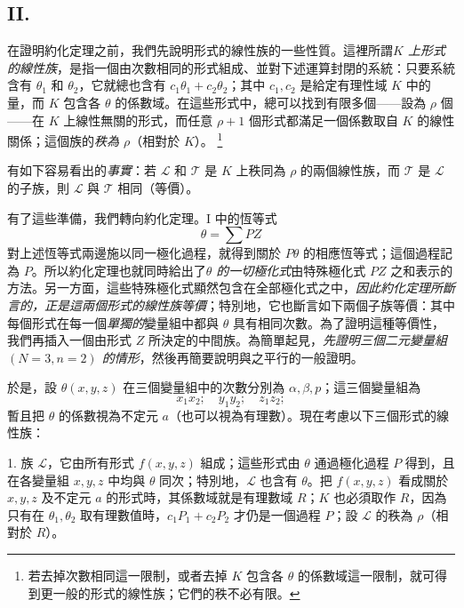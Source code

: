 \documentclass[11pt]{article}
\providecommand{\NoetherSrcNote}[2]{%
  \begingroup\renewcommand{\thefootnote}{#1}\footnote{#2}\addtocounter{footnote}{-1}\endgroup}
\begin{document}
\subsection*{II.}
在證明約化定理之前，我們先說明形式的線性族的一些性質。這裡所謂\emph{$K$ 上形式的線性族}，是指一個由次數相同的形式組成、並對下述運算封閉的系統：只要系統含有 $\theta_1$ 和 $\theta_2$，它就總也含有 $c_1\theta_1+c_2\theta_2$；其中 $c_1,c_2$ 是給定有理性域 $K$ 中的量，而 $K$ 包含各 $\theta$ 的係數域。在這些形式中，總可以找到有限多個——設為 $\rho$ 個——在 $K$ 上線性無關的形式，而任意 $\rho+1$ 個形式都滿足一個係數取自 $K$ 的線性關係；這個族的\emph{秩為 $\rho$}（相對於 $K$）。\NoetherSrcNote{*)}{若去掉次數相同這一限制，或者去掉 $K$ 包含各 $\theta$ 的係數域這一限制，就可得到更一般的形式的線性族；它們的秩不必有限。}有如下容易看出的\emph{事實}：若 $\mathcal L$ 和 $\mathcal T$ 是 $K$ 上秩同為 $\rho$ 的兩個線性族，而 $\mathcal T$ 是 $\mathcal L$ 的子族，則 $\mathcal L$ 與 $\mathcal T$ 相同（等價）。

有了這些準備，我們轉向約化定理。I 中的恆等式
\[
  \theta=\sum PZ
\]
對上述恆等式兩邊施以同一極化過程，就得到關於 $P\theta$ 的相應恆等式；這個過程記為 $P$。所以約化定理也就同時給出了\emph{$\theta$ 的一切極化式}由特殊極化式 $PZ$ 之和表示的方法。另一方面，這些特殊極化式顯然包含在全部極化式之中，\emph{因此約化定理所斷言的，正是這兩個形式的線性族等價}；特別地，它也斷言如下兩個子族等價：其中每個形式在每一個\emph{單獨的}變量組中都與 $\theta$ 具有相同次數。為了證明這種等價性，我們再插入一個由形式 $Z$ 所決定的中間族。為簡單起見，\emph{先證明三個二元變量組 $(N=3,n=2)$ 的情形}，然後再簡要說明與之平行的一般證明。

於是，設 $\theta(x,y,z)$ 在三個變量組中的次數分別為 $\alpha,\beta,p$；這三個變量組為
\[
  x_1x_2;\quad y_1y_2;\quad z_1z_2;
\]
暫且把 $\theta$ 的係數視為不定元 $a$（也可以視為有理數）。現在考慮以下三個形式的線性族：

1. 族 $\mathcal L$，它由所有形式 $f(x,y,z)$ 組成；這些形式由 $\theta$ 通過極化過程 $P$ 得到，且在各變量組 $x,y,z$ 中均與 $\theta$ 同次；特別地，$\mathcal L$ 也含有 $\theta$。把 $f(x,y,z)$ 看成關於 $x,y,z$ 及不定元 $a$ 的形式時，其係數域就是有理數域 $R$；$K$ 也必須取作 $R$，因為只有在 $\theta_1,\theta_2$ 取有理數值時，$c_1P_1+c_2P_2$ 才仍是一個過程 $P$；設 $\mathcal L$ 的秩為 $\rho$（相對於 $R$）。
\end{document}

